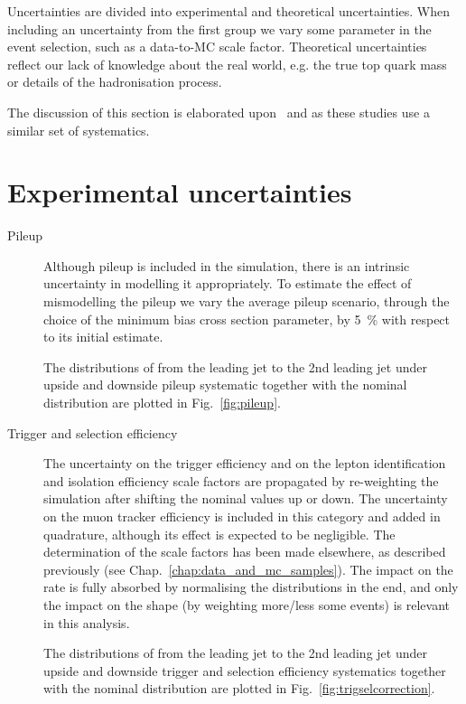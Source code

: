 Uncertainties are divided into experimental and theoretical uncertainties. When including an uncertainty from the first group we vary some parameter in the event selection, such as a data-to-MC scale factor. Theoretical uncertainties reflect our lack of knowledge about the real world, e.g. the true top quark mass or details of the hadronisation process.

The discussion of this section is elaborated upon~\cite{CMS-AN-2017-175} and \cite{CMS-AN-2017-159} as these studies use a similar set of systematics.

\section{Experimental uncertainties}
\begin{description}

\item[Pileup] Although pileup is included in the simulation, there is an intrinsic uncertainty in modelling it appropriately. To estimate the effect of mismodelling the pileup we vary the average pileup scenario, through the choice of the minimum bias cross section parameter, by 5~\% with respect to its initial estimate. 

The distributions of \pullangle from the leading jet \leadingjet to the 2nd leading jet \scndleadingjet under upside and downside pileup systematic together with the nominal distribution are plotted in Fig.~\ref{fig:pileup}.

\item[Trigger and selection efficiency] The uncertainty on the trigger efficiency and on the lepton identification and isolation efficiency scale factors are propagated by re-weighting the simulation after shifting the nominal values up or down. The uncertainty on the muon tracker efficiency is included in this category and added in quadrature, although its effect is expected to be negligible.  The determination of the scale factors has been made elsewhere, as described previously (see Chap.~\ref{chap:data_and_mc_samples}). The impact on the rate is fully absorbed by normalising the distributions in the end, and only the impact on the shape (by weighting more/less some events) is relevant in this analysis.

The distributions of \pullangle from the leading jet \leadingjet to the 2nd leading jet \scndleadingjet under upside and downside trigger and selection efficiency systematics together with the nominal distribution are plotted in Fig.~\ref{fig:trigselcorrection}.


\end{description}
